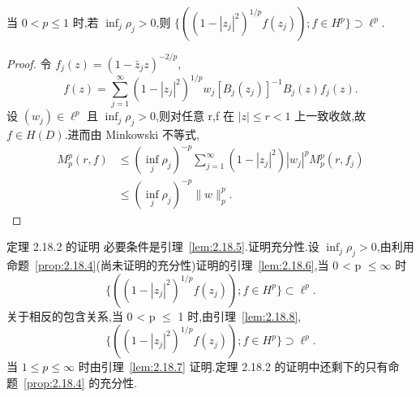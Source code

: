 \begin{lemma}\label{lem:2.18.8}
当 $0 < p \leq 1$ 时,若 $\inf_{j}\rho_{j} > 0$,则 $\{((1 - |z_{j}|^{2})^{1/p}f(z_{j})); f \in H^{p}\} \supset \ell^{p}$.
\end{lemma}

\begin{proof}
令 $f_{j}(z) = (1 - \bar{z}_{j}z)^{-2/p}$,
\begin{equation*}
f(z) = \sum_{j=1}^{\infty}(1 - |z_{j}|^{2})^{1/p}w_{j}[B_{j}(z_{j})]^{-1}B_{j}(z)f_{j}(z).
\end{equation*}
设 $(w_{j}) \in \ell^{p}$ 且 $\inf_{j}\rho_{j} > 0$,则对任意 r,f 在 $|z| \leq r < 1$ 上一致收敛,故 $f \in H(D)$.进而由 Minkowski 不等式,
\begin{align*}
M_{p}^{p}(r, f) &\leq (\inf_{j}\rho_{j})^{-p}\sum_{j=1}^{\infty}(1 - |z_{j}|^{2})|w_{j}|^{p}M_{p}^{p}(r, f_{j}) \\
&\leq (\inf_{j}\rho_{j})^{-p}\|w\|_{p}^{p}.
\end{align*}
\end{proof}

定理 2.18.2 的证明 必要条件是引理~\ref{lem:2.18.5}.证明充分性.设 $\inf_{j}\rho_{j} > 0$,由利用命题~\ref{prop:2.18.4}(尚未证明的充分性)证明的引理~\ref{lem:2.18.6},当 0 < p $\leq \infty$ 时
\begin{equation*}
\{((1 - |z_{j}|^{2})^{1/p}f(z_{j})); f \in H^{p}\} \subset \ell^{p}.
\end{equation*}
关于相反的包含关系,当 0 < p $\leq$ 1 时,由引理~\ref{lem:2.18.8},
\begin{equation*}
\{((1 - |z_{j}|^{2})^{1/p}f(z_{j})); f \in H^{p}\} \supset \ell^{p}.
\end{equation*}
当 $1 \leq p \leq \infty$ 时由引理~\ref{lem:2.18.7} 证明.定理 2.18.2 的证明中还剩下的只有命题~\ref{prop:2.18.4} 的充分性.
